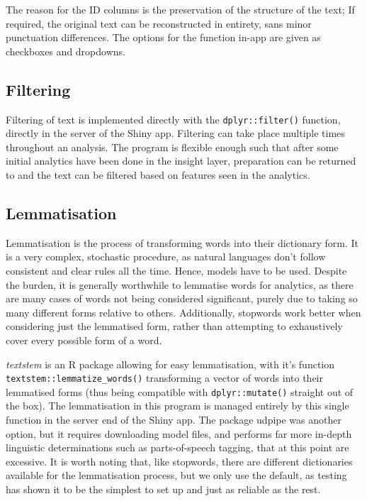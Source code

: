 \message{ !name(jason-cairns-dissertation.tex)}\documentclass[11pt, a4paper, titlepage]{report}
\begin{document}
The reason for the ID columns is the preservation of the structure of
the text; If required, the original text can be reconstructed in
entirety, sans minor punctuation differences. The options for the
function in-app are given as checkboxes and dropdowns.

\subsection{Filtering}

Filtering of text is implemented directly with the
\texttt{dplyr::filter()} function, directly in the server of
the Shiny app. Filtering can take place multiple times throughout an
analysis. The program is flexible enough such that after some initial
analytics have been done in the insight layer, preparation can be
returned to and the text can be filtered based on features seen in the
analytics.

\subsection{Lemmatisation}

Lemmatisation is the process of transforming words into their
dictionary form. It is a very complex, stochastic procedure, as
natural languages don't follow consistent and clear rules all the
time. Hence, models have to be used. Despite the burden, it is
generally worthwhile to lemmatise words for analytics, as there are
many cases of words not being considered significant, purely due to
taking so many different forms relative to others. Additionally,
stopwords work better when considering just the lemmatised form,
rather than attempting to exhaustively cover every possible form of a
word.

\textit{textstem} is an R package allowing for easy lemmatisation,
with it's function \texttt{textstem::lemmatize_words()}
transforming a vector of words into their lemmatised forms (thus being
compatible with \texttt{dplyr::mutate()} straight out of the
box)\autocite{rinker18}. The lemmatisation in this program is managed
entirely by this single function in the server end of the Shiny app.
The package udpipe was another option, but it requires downloading
model files, and performs far more in-depth linguistic determinations
such as parts-of-speech tagging, that at this point are excessive. It
is worth noting that, like stopwords, there are different dictionaries
available for the lemmatisation process, but we only use the default,
as testing has shown it to be the simplest to set up and just as
reliable as the rest.
\end{document}
